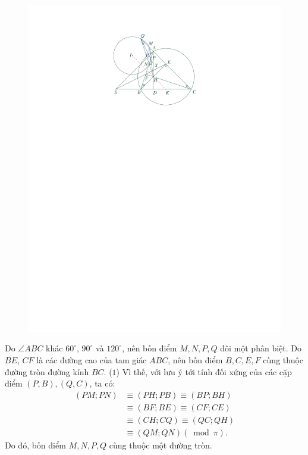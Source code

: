 \begin{multicols}{2}
\begin{figure}[H]
		\includegraphics[width=1\linewidth]{P699}
		\vspace*{-15pt}
	\end{figure}
	Do $\angle ABC$  khác $60^\circ$, $90^\circ$   và $120^\circ$, nên bốn điểm $M, N, P, Q$ đôi một phân biệt.
	\vskip 0.05cm
	Do $BE$, $CF$ là các đường cao của tam giác $ABC$, nên bốn điểm $B, C, E, F$ cùng thuộc đường tròn đường kính $BC$. \hfill ($1$)
	\vskip 0.05cm
	Vì thế, với lưu ý tới tính đối xứng của các cặp điểm $(P, B), (Q, C)$, ta có:
	\begin{align*}
			\left( {PM;PN} \right) &\equiv \left( {PH;PB} \right) \equiv \left( {BP;BH} \right) \\
			&\equiv \left( {BF;BE} \right)
			\equiv \left( {CF;CE} \right) \\
			&\equiv \left( {CH;CQ} \right) \equiv \left( {QC;QH} \right)\\
			&\equiv \left( {QM;QN} \right)\left( {\bmod \pi } \right).
	\end{align*}
	Do đó, bốn điểm $M, N, P, Q$ cùng thuộc một đường tròn.

\end{multicols}
